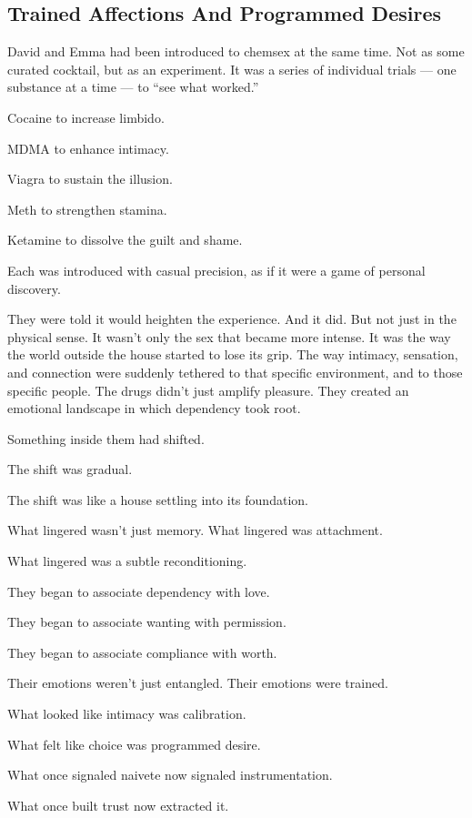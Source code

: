 
\subsection{Trained Affections And Programmed Desires}


David and Emma had been introduced to chemsex at the same time. Not as some curated cocktail, but as an experiment. 
It was a series of individual trials --- one substance at a time --- to ``see what worked.'' 

Cocaine to increase limbido. 

MDMA to enhance intimacy. 

Viagra to sustain the illusion. 

Meth to strengthen stamina. 

Ketamine to dissolve the guilt and shame. 

Each was introduced with casual precision, as if it were a game of personal discovery.

They were told it would heighten the experience. And it did. But not just in the physical sense. It wasn’t only 
the sex that became more intense. It was the way the world outside the house started to lose its grip. 
The way intimacy, sensation, and connection were suddenly tethered to that specific environment, and to those 
specific people. The drugs didn’t just amplify pleasure. They created an emotional landscape in which 
dependency took root.

Something inside them had shifted. 

The shift was gradual. 

The shift was like a house settling into its foundation. 

What lingered wasn’t just memory. 
What lingered was attachment. 

What lingered was a subtle reconditioning. 

They began to associate dependency with love. 

They began to associate wanting with permission.

They began to associate compliance with worth.

Their emotions weren’t just entangled. 
Their emotions were trained.

What looked like intimacy was calibration.

What felt like choice was programmed desire.

What once signaled naivete now signaled instrumentation.

What once built trust now extracted it.

